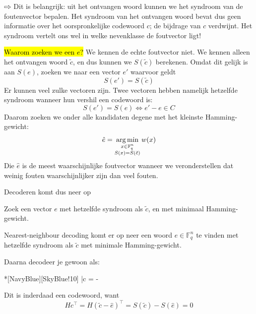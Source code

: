 $\rightwhitearrow$ Dit is belangrijk: uit het ontvangen woord kunnen we het syndroom van de foutenvector bepalen. Het syndroom van het ontvangen woord bevat dus geen informatie over het oorspronkelijke codewoord $c$; de bijdrage van $c$ verdwijnt. Het syndroom vertelt ons wel in welke nevenklasse de foutvector ligt!

\hl{Waarom zoeken we een $e$?}\newline
We kennen de echte foutvector niet. We kennen alleen het ontvangen woord $\tilde{c}$, en dus kunnen we $S(\tilde{c})$ berekenen.
Omdat dit gelijk is aan $S(e)$, zoeken we naar een vector $e'$ waarvoor geldt
\begin{equation*}
    S(e') = S(\tilde{c})
\end{equation*}
Er kunnen veel zulke vectoren zijn. Twee vectoren hebben namelijk hetzelfde syndroom wanneer hun vershil een codewoord is:
\begin{equation*}
    S(e') = S(e) \iff e' - e \in C
\end{equation*}
Daarom zoeken we onder alle kandidaten degene met het kleinste Hamming-gewicht:
\begin{equation*}
    \hat{e} = \operatorname*{arg\,min}_{\substack{x \in \mathbb{F}_q^n \\ S(x) = S(\tilde{c})}} w(x)
\end{equation*}
Die $\hat{e}$ is de meest waarschijnlijke foutvector wanneer we veronderstellen dat weinig fouten waarschijnlijker zijn dan veel fouten.

Decoderen komt dus neer op

\begin{barbox}[NavyBlue][SkyBlue!10]
    Zoek een vector $e$ met hetzelfde syndroom als $\tilde{c}$, en met minimaal Hamming-gewicht.

    \vspace{0.25cm}

    Nearest-neighbour decoding komt er op neer een woord $e \in \mathbb{F}_q^n$ te vinden met hetzelfde syndroom als $\tilde{c}$ met minimale Hamming-gewicht.
\end{barbox}

Daarna decodeer je gewoon als:
\begin{equationbox}*[NavyBlue][SkyBlue!10]
    \bar{c} =  - 
\end{equationbox}

Dit is inderdaad een codewoord, want
\begin{equation*}
    Hc^\top = H(\tilde{c} - \hat{e})^\top = S(\tilde{c}) - S(\hat{e}) = 0
\end{equation*}

